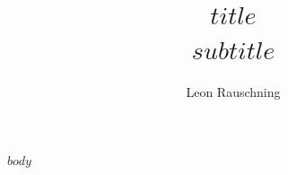 \documentclass[11pt, a4paper]{article}
\title{\huge $title$\\ \Large $subtitle$}
\author{Leon Rauschning}
\begin{document}
\pagestyle{fancy}
\maketitle

$body$
\end{document}
